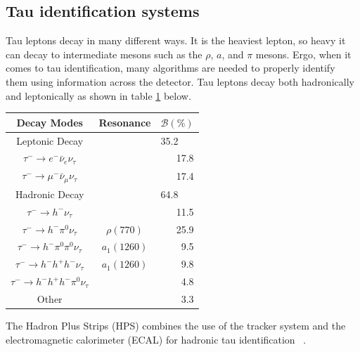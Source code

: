 \subsection{Tau identification systems}
Tau leptons decay in many different ways. It is the heaviest lepton, so heavy it can decay to intermediate mesons such as the $\rho$, $a$, and $\pi$ mesons.
Ergo, when it comes to tau identification, many algorithms are needed to properly identify them using information across the detector. 
Tau leptons decay both hadronically and leptonically as shown in table \ref{tab:taudecay} below. 



\begin{table}[h!tbp]
\centering
\label{tab:taudecay}
\begin{tabular}{c c r}
Decay Modes & Resonance & \multicolumn{1}{c}{$\mathcal{B}(\%)$} \\\hline
Leptonic Decay && \multicolumn{1}{l}{35.2}\\
$\tau^- \rightarrow e^- \bar{\nu}_e \nu_\tau $ & & 17.8 \\
$\tau^- \rightarrow \mu^- \bar{\nu}_\mu \nu_\tau$ & & 17.4 \\\hline
Hadronic Decay && \multicolumn{1}{l}{64.8}\\
$\tau^- \rightarrow h^-\nu_\tau$ & & 11.5 \\
$\tau^- \rightarrow h^-\pi^0 \nu_\tau$ & $\rho(770)$ & 25.9 \\
$\tau^- \rightarrow h^-\pi^0 \pi^0 \nu_\tau$ & $a_1(1260)$ & 9.5 \\
$\tau^- \rightarrow h^- h^+ h^- \nu_\tau$ & $a_1(1260)$ & 9.8 \\
$\tau^- \rightarrow h^- h^+ h^- \pi^0 \nu_\tau$ & & 4.8 \\
Other & & 3.3 \\\hline
\end{tabular}
\end{table}


The Hadron Plus Strips (HPS) combines the use of the tracker system and the electromagnetic calorimeter (ECAL) for hadronic tau identification ~\cite{Sirunyan_2018}.  


